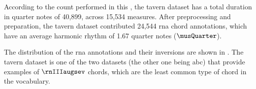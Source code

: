 
According to the count performed in this \thesisdiss{}, the
\gls{tavern} dataset has a total duration in quarter notes
of 40,899, across 15,534 measures. After preprocessing and
preparation, the \gls{tavern} dataset contributed 24,544
\gls{rna} chord annotations, which have an average harmonic
rhythm of 1.67 quarter notes ($\musQuarter$).

The distribution of the \gls{rna} annotations and their
inversions are shown in . The
\gls{tavern} dataset is one of the two datasets (the other
one being \gls{abc}) that provide examples of $\rnIIIaugsev$
chords, which are the least common type of chord in the
vocabulary.




